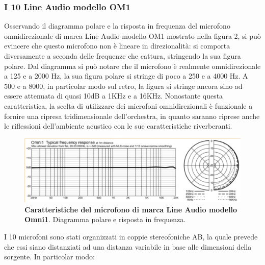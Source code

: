 \subsubsection*{I 10 Line Audio modello OM1}
Osservando il diagramma polare e la risposta in frequenza del microfono omnidirezionale di marca Line Audio modello OM1 mostrato nella figura 2, si può evincere che questo microfono non è lineare in direzionalità: si comporta diversamente a seconda delle frequenze che cattura, stringendo la sua figura polare. Dal diagramma si può notare che il microfono è realmente omnidirezionale a 125 e a 2000 Hz, la sua figura polare si stringe di poco a 250 e a 4000 Hz. A 500 e a 8000, in particolar modo sul retro, la figura si stringe ancora sino ad essere attenuata di quasi 10dB a 1KHz e a 16KHz.
Nonostante questa caratteristica, la scelta di utilizzare dei microfoni omnidirezionali è funzionale a fornire una ripresa tridimensionale dell'orchestra, in quanto saranno riprese anche le riflessioni dell'ambiente acustico con le sue caratteristiche riverberanti.

\begin{figure}[b]
	\begin{center}
		\includegraphics[width=.47\textwidth]{img/image1.png}
		\caption{\textbf{Caratteristiche del microfono di marca Line Audio modello Omni1}. Diagramma polare e risposta in frequenza.}
		\label{gr01}
	\end{center}
\end{figure}

I 10 microfoni sono stati organizzati in coppie stereofoniche AB, la quale prevede che essi siano distanziati ad una distanza variabile in base alle dimensioni della sorgente. In particolar modo:

